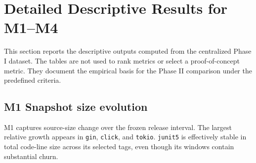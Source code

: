\section{Detailed Descriptive Results for M1--M4}
\label{sec:phase1_detailed_results}

This section reports the descriptive outputs computed from the centralized Phase I dataset.
The tables are not used to rank metrics or select a proof-of-concept metric. They document
the empirical basis for the Phase II comparison under the predefined criteria.

\subsection{M1 Snapshot size evolution}
\label{sec:results_m1}

\begin{table}[H]
\centering
\scriptsize
\renewcommand{\arraystretch}{1.12}
\caption{M1 code-line evolution across frozen tags. First and last values follow chronological tag order.}
\label{tab:m1_detailed}
\end{table}

M1 captures source-size change over the frozen release interval. The largest relative growth appears in
\texttt{gin}, \texttt{click}, and \texttt{tokio}. \texttt{junit5} is effectively stable in total code-line
size across its selected tags, even though its windows contain substantial churn.

